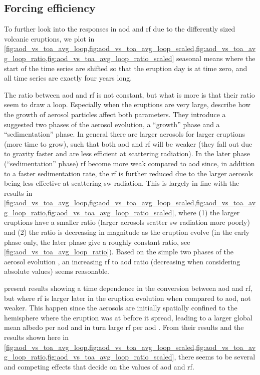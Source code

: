 \documentclass{ametsocV5}
\begin{document}
\subsection{Forcing efficiency}

To further look into the responses in \acrshort{aod} and \acrshort{rf} due to the
differently sized volcanic eruptions, we plot in
\cref{fig:aod_vs_toa_avg_loop,fig:aod_vs_toa_avg_loop_scaled,fig:aod_vs_toa_avg_loop_ratio,fig:aod_vs_toa_avg_loop_ratio_scaled}
seasonal means where the start of the time series are shifted so that the eruption day
is at time zero, and all time series are exactly four years long.


The ratio between \acrshort{aod} and \acrshort{rf} is not constant, but what is more is
that their ratio seem to draw a loop. Especially when the eruptions are very large,
\citet[][see their sections 3.1.2, 3.2.2]{marshall2019} describe how the growth of
aerosol particles affect both parameters. They introduce a suggested two phases of the
aerosol evolution, a ``growth'' phase and a ``sedimentation'' phase. In general there
are larger aerosols for larger eruptions (more time to grow), such that both
\acrshort{aod} and \acrshort{rf} will be weaker (they fall out due to gravity faster and
are less efficient at scattering radiation). In the later phase (``sedimentation''
phase) \acrshort{rf} become more weak compared to \acrshort{aod} since, in addition to a
faster sedimentation rate, the \acrshort{rf} is further reduced due to the larger
aerosols being less effective at scattering \acrshort{sw} radiation. This is largely in
line with the results in
\cref{fig:aod_vs_toa_avg_loop,fig:aod_vs_toa_avg_loop_scaled,fig:aod_vs_toa_avg_loop_ratio,fig:aod_vs_toa_avg_loop_ratio_scaled},
where (1) the larger eruptions have a smaller ratio (larger aerosols scatter
\acrshort{sw} radiation more poorly) and (2) the ratio is decreasing in magnitude as the
eruption evolve (in the early phase only, the later phase give a roughly constant ratio,
see \cref{fig:aod_vs_toa_avg_loop_ratio}). Based on the simple two phases of the aerosol
evolution \citep{marshall2019}, an increasing \acrshort{rf} to \acrshort{aod} ratio
(decreasing when considering absolute values) seems reasonable.

\citet[][their figure 1c,d]{marshall2020} present results showing a time dependence in
the conversion between \acrshort{aod} and \acrshort{rf}, but where \acrshort{rf} is
larger later in the eruption evolution when compared to \acrshort{aod}, not weaker. This
happen since the aerosols are initially spatially confined to the hemisphere where the
eruption was at before it spread, leading to a larger global mean albedo per
\acrshort{aod} and in turn large \acrshort{rf} per \acrshort{aod} \citep{marshall2020}.
From their results and the results shown here in
\cref{fig:aod_vs_toa_avg_loop,fig:aod_vs_toa_avg_loop_scaled,fig:aod_vs_toa_avg_loop_ratio,fig:aod_vs_toa_avg_loop_ratio_scaled},
there seems to be several and competing effects that decide on the values of
\acrshort{aod} and \acrshort{rf}.
\end{document}
